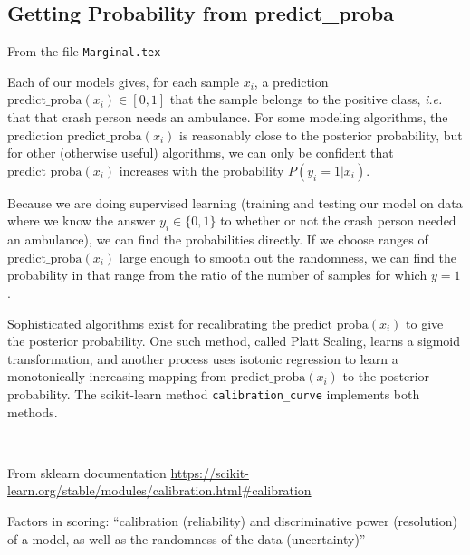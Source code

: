 \subsection{Getting Probability from predict\_proba}\label{Marginal}

From the file \verb|Marginal.tex|

Each of our models gives, for each sample $x_i$, a prediction $\text{predict\_proba}(x_i) \in [0,1]$ that the sample belongs to the positive class, {\it i.e.} that that crash person needs an ambulance.  For some modeling algorithms, the prediction $\text{predict\_proba}(x_i)$ is reasonably close to the posterior probability, but for other (otherwise useful) algorithms, we can only be confident that $\text{predict\_proba}(x_i)$ increases with the probability $P(y_i=1 | x_i)$.
\cite{Niculescu-Mizil_2005}

 Because we are doing supervised learning (training and testing our model on data where we know the answer $y_i \in \{0,1\}$ to whether or not the crash person needed an ambulance), we can find the probabilities directly.  If we choose ranges of $\text{predict\_proba}(x_i)$ large enough to smooth out the randomness, we can find the probability in that range from the ratio of the number of samples for which $y=1$.  

Sophisticated algorithms exist for recalibrating the $\text{predict\_proba}(x_i)$ to give the posterior probability.  One such method, called Platt Scaling, learns a sigmoid transformation, and another process uses isotonic regression to learn a monotonically increasing mapping from $\text{predict\_proba}(x_i)$ to the posterior probability.  The scikit-learn method \verb|calibration_curve| implements both methods.  

\

From sklearn documentation \url{https://scikit-learn.org/stable/modules/calibration.html#calibration}

Factors in scoring:   ``calibration (reliability) and discriminative power (resolution) of a model, as well as the randomness of the data (uncertainty)''